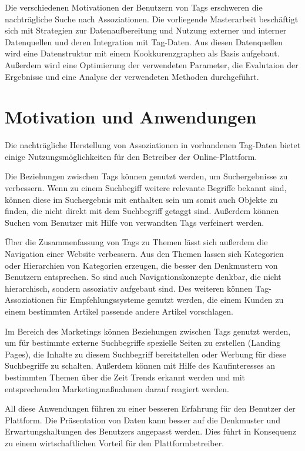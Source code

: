 Die verschiedenen Motivationen der Benutzern von Tags erschweren die nachträgliche Suche nach Assoziationen. Die vorliegende Masterarbeit beschäftigt sich mit Strategien zur Datenaufbereitung und Nutzung externer und interner Datenquellen und deren Integration mit Tag-Daten. Aus diesen Datenquellen wird eine Datenstruktur mit einem Kookkurenzgraphen als Basis aufgebaut. Außerdem wird eine Optimierung der verwendeten Parameter, die Evalutaion der Ergebnisse und eine Analyse der verwendeten Methoden durchgeführt.

\section{Motivation und Anwendungen}

Die nachträgliche Herstellung von Assoziationen in vorhandenen Tag-Daten bietet einige Nutzungsmöglichkeiten für den Betreiber der Online-Plattform.

Die Beziehungen zwischen Tags können genutzt werden, um Suchergebnisse zu verbessern. Wenn zu einem Suchbegiff weitere relevante Begriffe bekannt sind, können diese im Suchergebnis mit enthalten sein um somit auch Objekte zu finden, die nicht direkt mit dem Suchbegriff getaggt sind. Außerdem können Suchen vom Benutzer mit Hilfe von verwandten Tags verfeinert werden.

Über die Zusammenfassung von Tags zu Themen lässt sich außerdem die Navigation einer Website verbessern. Aus den Themen lassen sich Kategorien oder Hierarchien von Kategorien erzeugen, die besser den Denkmustern von Benutzern entsprechen. So sind auch Navigationskonzepte denkbar, die nicht hierarchisch, sondern assoziativ aufgebaut sind. Des weiteren können Tag-Assoziationen für Empfehlungssysteme genutzt werden, die einem Kunden zu einem bestimmten Artikel passende andere Artikel vorschlagen.

Im Bereich des Marketings können Beziehungen zwischen Tags genutzt werden, um für bestimmte externe Suchbegriffe spezielle Seiten zu erstellen (Landing Pages), die Inhalte zu diesem Suchbegriff bereitstellen oder Werbung für diese Suchbegriffe zu schalten. Außerdem können mit Hilfe des Kaufinteresses an bestimmten Themen über die Zeit Trends erkannt werden und mit entsprechenden Marketingmaßnahmen darauf reagiert werden.

All diese Anwendungen führen zu einer besseren Erfahrung für den Benutzer der Plattform. Die Präsentation von Daten kann besser auf die Denkmuster und Erwartungshaltungen des Benutzers angepasst werden. Dies führt in Konsequenz zu einem wirtschaftlichen Vorteil für den Plattformbetreiber.

